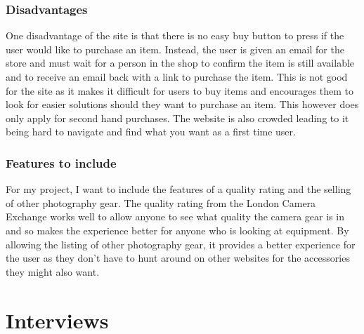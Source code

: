 \subsubsection{Disadvantages}
One disadvantage of the site is that there is no easy buy button to press if the user would like to purchase an item. Instead, the user is given an email for the store and must wait for a person in the shop to confirm the item is still available and to receive an email back with a link to purchase the item. This is not good for the site as it makes it difficult for users to buy items and encourages them to look for easier solutions should they want to purchase an item. This however does only apply for second hand purchases. The website is also crowded leading to it being hard to navigate and find what you want as a first time user.
\subsubsection{Features to include}
For my project, I want to include the features of a quality rating and the selling of other photography gear. The quality rating from the London Camera Exchange works well to allow anyone to see what quality the camera gear is in and so makes the experience better for anyone who is looking at equipment. By allowing the listing of other photography gear, it provides a better experience for the user as they don’t have to hunt around on other websites for the accessories they might also want.

\section{Interviews}
